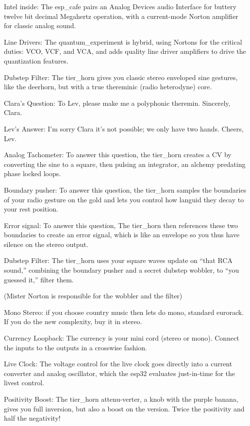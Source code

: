 Intel inside: The esp\_cafe pairs an Analog Devices audio Interface for buttery twelve bit decimal Megahertz operation, with a current-mode Norton amplifier for classic analog sound.

Line Drivers: The quantum\_experiment is hybrid, using Nortons for the critical duties: VCO, VCF, and VCA, and adds quality line driver amplifiers to drive the quantization features.

Dubstep Filter: The tier\_horn gives you classic stereo enveloped sine gestures, like the deerhorn, but with a true thereminic (radio heterodyne) core.

Clara's Question: To Lev, please make me a polyphonic theremin. Sincerely, Clara.

Lev's Answer: I'm sorry Clara it's not possible; we only have two hands. Cheers, Lev.

Analog Tachometer: To answer this question, the tier\_horn creates a CV by converting the sine to a square, then pulsing an integrator, an alchemy predating phase locked loops.

Boundary pusher: To answer this question, the tier\_horn samples the boundaries of your radio gesture on the gold and lets you control how languid they decay to your rest position.

Error signal: To answer this question, The tier\_horn then references these two boundaries to create an error signal, which is like an envelope so you thus have silence on the stereo output.

Dubstep Filter: The tier\_horn uses your square waves update on “that RCA sound,” combining the boundary pusher and a secret dubstep wobbler, to “you guessed it,” filter them.

(Mister Norton is responsible for the wobbler and the filter)

Mono Stereo: if you choose country music then lets do mono, standard eurorack. If you do the new complexity, buy it in stereo.

Currency Loopback: The currency is your mini cord (stereo or mono). Connect the inputs to the outputs in a crosswise fashion.

Live Clock: The voltage control for the live clock goes directly into a current converter and analog oscillator, which the esp32 evaluates just-in-time for the livest control.

Positivity Boost: The tier\_horn attenu-verter, a knob with the purple banana, gives you full inversion, but also a boost on the version. Twice the positivity and half the negativity!

